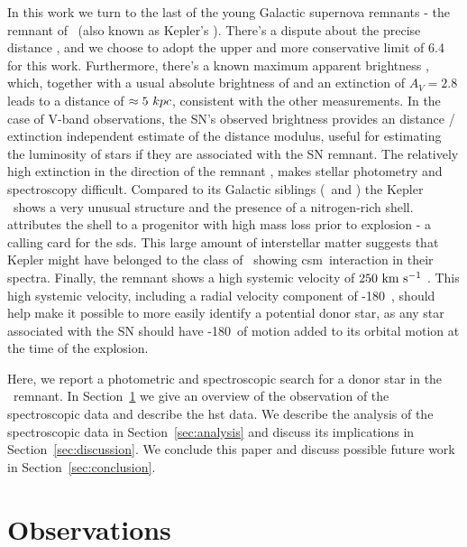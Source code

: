 \documentclass[preprint2]{aastex}
\begin{document}
In this work we turn to the last of the young Galactic supernova remnants - the remnant of \ (also known as Kepler's \sn). There's a dispute about the precise distance \citep[$4-6.4$\,\kpc; see][and references therein]{2012A&A...537A.139C}, and we choose to adopt the upper and more conservative limit of 6.4~\kpc\ \citep{1999AJ....118..926R} for this work. Furthermore, there's a known maximum apparent brightness \citep[V=-3;][]{1971SvA....14..798P}, which, together with a usual absolute brightness of \sneia \citep[$M_V=-19.3$;][]{2011ApJ...732..129R} and an extinction of $A_V=2.8$ leads to a distance of $\approx 5~kpc$, consistent with the other measurements. In the case of V-band observations, the SN's observed brightness provides an distance / extinction independent estimate of the distance modulus, useful for estimating the luminosity of stars if they are associated with the SN remnant. The relatively high extinction in the direction of the remnant \citep[$A_V=2.8$, ][]{2007ApJ...668L.135R}, makes stellar photometry and spectroscopy difficult. Compared to its Galactic siblings (\ and ) the Kepler \snr\ shows a very unusual structure and the presence of a nitrogen-rich shell.  \citet{2012A&A...537A.139C} attributes the shell to a progenitor with high mass loss prior to explosion - a calling card for the \gls{sds}. This large amount of interstellar matter suggests that Kepler might have belonged to the class of \sneia\ showing \gls{csm}\ interaction in their spectra. Finally, the remnant shows a high systemic velocity of  $250~\textrm{km}~\textrm{s}^{-1}$ \citep{1991ApJ...366..484B,2003A&A...407..249S}. This high systemic velocity, including a radial velocity component of -180~\kms , should help make it possible to more easily identify a potential donor star, as any star associated with the SN should have -180~\kms of motion added to its orbital motion at the time of the explosion.



Here, we report a photometric and spectroscopic search for a donor star in the \ remnant. In Section~\ref{sec:observations} we give an overview of the observation of the spectroscopic data and describe the \gls{hst} data. We describe the analysis of the spectroscopic data in Section~\ref{sec:analysis} and discuss its implications in Section~\ref{sec:discussion}. We conclude this paper and discuss possible future work in Section~\ref{sec:conclusion}.


\section{Observations}
\label{sec:observations}
\end{document}
